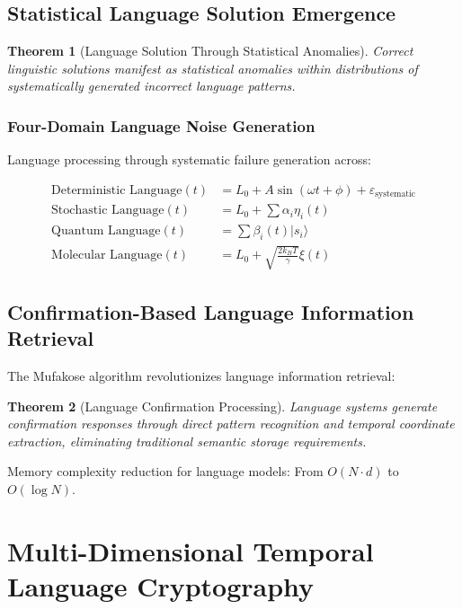 \documentclass[12pt,a4paper]{article}
\newtheorem{theorem}{Theorem}
\begin{document}
\subsection{Statistical Language Solution Emergence}

\begin{theorem}[Language Solution Through Statistical Anomalies]
Correct linguistic solutions manifest as statistical anomalies within distributions of systematically generated incorrect language patterns.
\end{theorem}

\subsubsection{Four-Domain Language Noise Generation}

Language processing through systematic failure generation across:

\begin{align}
\text{Deterministic Language}(t) &= L_0 + A \sin(\omega t + \phi) + \varepsilon_{\text{systematic}} \\
\text{Stochastic Language}(t) &= L_0 + \sum \alpha_i \eta_i(t) \\
\text{Quantum Language}(t) &= \sum \beta_i(t) |s_i\rangle \\
\text{Molecular Language}(t) &= L_0 + \sqrt{\frac{2k_B T}{\gamma}} \xi(t)
\end{align}

\subsection{Confirmation-Based Language Information Retrieval}

The Mufakose algorithm revolutionizes language information retrieval:

\begin{theorem}[Language Confirmation Processing]
Language systems generate confirmation responses through direct pattern recognition and temporal coordinate extraction, eliminating traditional semantic storage requirements.
\end{theorem}

Memory complexity reduction for language models: From $O(N \cdot d)$ to $O(\log N)$.

\section{Multi-Dimensional Temporal Language Cryptography}
\end{document}
